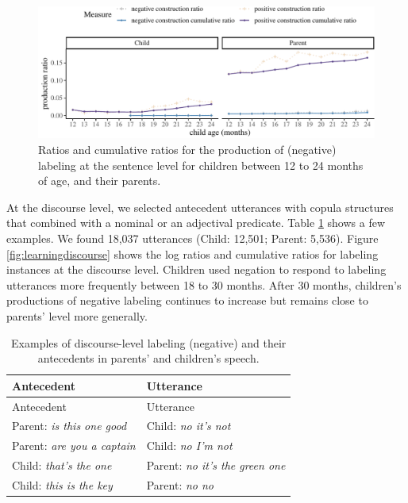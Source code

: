 \documentclass[
  english,
  man,floatsintext]{apa6}
\begin{document}
\begin{figure}[H]

{\centering \includegraphics{neg_construction_article_files/figure-latex/learningbegin-1} 

}

\caption{Ratios and cumulative ratios for the production of (negative) labeling at the sentence level for children between 12 to 24 months of age, and their parents.}\label{fig:learningbegin}
\end{figure}

At the discourse level, we selected antecedent utterances with copula structures that combined with a nominal or an adjectival predicate. Table \ref{tab:dislabel} shows a few examples. We found 18,037 utterances (Child: 12,501; Parent: 5,536). Figure \ref{fig:learningdiscourse} shows the log ratios and cumulative ratios for labeling instances at the discourse level. Children used negation to respond to labeling utterances more frequently between 18 to 30 months. After 30 months, children's productions of negative labeling continues to increase but remains close to parents' level more generally.

\begin{longtable}[]{@{}ll@{}}
\caption{\label{tab:dislabel} Examples of discourse-level labeling (negative) and their antecedents in parents' and children's speech.}\tabularnewline
\toprule
Antecedent & Utterance \\
\midrule
\endfirsthead
\toprule
Antecedent & Utterance \\
\midrule
\endhead
Parent: \emph{is this one good} & Child: \emph{no it's not} \\
Parent: \emph{are you a captain} & Child: \emph{no I'm not} \\
Child: \emph{that's the one} & Parent: \emph{no it's the green one} \\
Child: \emph{this is the key} & Parent: \emph{no no} \\
\bottomrule
\end{longtable}
\end{document}
